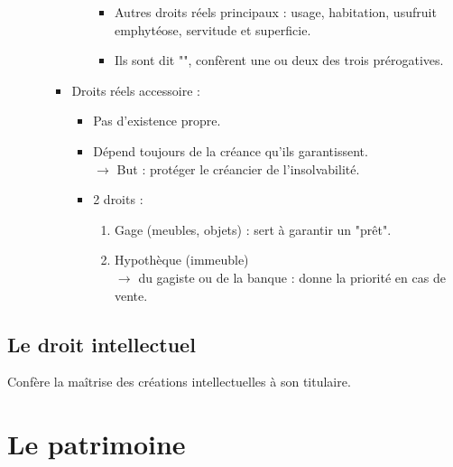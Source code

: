 \begin{enumerate}
\begin{itemize}
\begin{itemize}
\begin{itemize}
\begin{itemize}
	    	    	    	    \item Autres droits réels principaux : usage, habitation, usufruit emphytéose, servitude et superficie.
	    	    	    	    \item Ils sont dit "", confèrent une ou deux des trois prérogatives.
	    	    	    \end{itemize}
	    	    \end{itemize}\smallskip
	    	    \item Droits réels accessoire :
	    	    \begin{itemize}
	    	    	    \item Pas d'existence propre.
	    	    	    \item Dépend toujours de la créance qu'ils garantissent.\\
	    	    	    $\rightarrow$ But : protéger le créancier de l'insolvabilité.
	    	    	    \item 2 droits :
	    	    	    \begin{enumerate}
	    	    	    	    \item Gage (meubles, objets) : sert à garantir un "prêt".
	    	    	    	    \item Hypothèque (immeuble)\\
	    	    	    	    $\rightarrow$  du gagiste ou de la banque : donne la priorité en cas de vente.
	    	    	    \end{enumerate}
	    	    \end{itemize}
	    \end{itemize}
	\end{itemize}
\end{enumerate}

\subsection{Le droit intellectuel}

Confère la maîtrise des créations intellectuelles à son titulaire.

\section{Le patrimoine}

